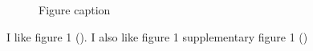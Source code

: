 \documentclass[9pt,lineno]{elife}
\begin{document}
\begin{figure}[ht!]
\centering
{}
\caption{
Figure caption
}
\label{fig:Fig1}
\label{figsupp:f1S1}
\end{figure}



I like figure 1 ().
I also like figure 1 supplementary figure 1 ()
\end{document}
